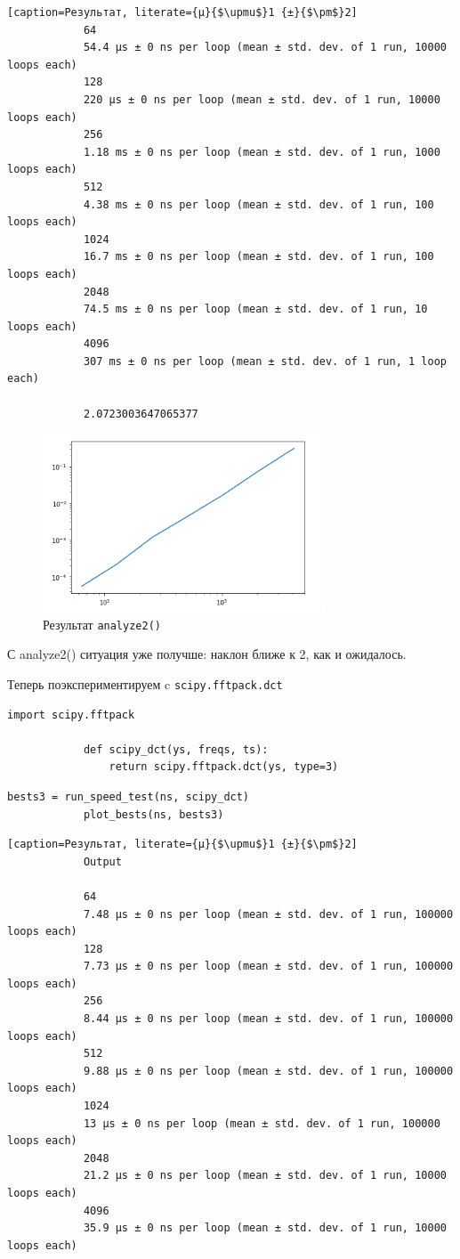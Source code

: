 \documentclass[a4paper,12pt]{article}
\begin{document}
\begin{enumerate}
\begin{lstlisting}[caption=Результат, literate={µ}{$\upmu$}1 {±}{$\pm$}2]
			64
			54.4 µs ± 0 ns per loop (mean ± std. dev. of 1 run, 10000 loops each)
			128
			220 µs ± 0 ns per loop (mean ± std. dev. of 1 run, 10000 loops each)
			256
			1.18 ms ± 0 ns per loop (mean ± std. dev. of 1 run, 1000 loops each)
			512
			4.38 ms ± 0 ns per loop (mean ± std. dev. of 1 run, 100 loops each)
			1024
			16.7 ms ± 0 ns per loop (mean ± std. dev. of 1 run, 100 loops each)
			2048
			74.5 ms ± 0 ns per loop (mean ± std. dev. of 1 run, 10 loops each)
			4096
			307 ms ± 0 ns per loop (mean ± std. dev. of 1 run, 1 loop each)
			
			2.0723003647065377
		\end{lstlisting}
		
		\begin{figure}[H]
			\centering
			\includegraphics[width=0.75\textwidth]{1_2.png}
			\caption{Результат \texttt{analyze2()}}
			\label{fig:1.2}
		\end{figure}
		
		С analyze2() ситуация уже получше: наклон ближе к 2, как и ожидалось.
		
		Теперь поэкспериментируем c \texttt{scipy.fftpack.dct}
		
		\begin{lstlisting}[caption=Функция \texttt{scipy\_dct()}]
			import scipy.fftpack
			
			def scipy_dct(ys, freqs, ts):
				return scipy.fftpack.dct(ys, type=3)
		\end{lstlisting}
		\begin{lstlisting}[caption=Работа с \texttt{scipy\_dct()}]
			bests3 = run_speed_test(ns, scipy_dct)
			plot_bests(ns, bests3)
		\end{lstlisting}
		\begin{lstlisting}[caption=Результат, literate={µ}{$\upmu$}1 {±}{$\pm$}2]
			Output
			
			64
			7.48 µs ± 0 ns per loop (mean ± std. dev. of 1 run, 100000 loops each)
			128
			7.73 µs ± 0 ns per loop (mean ± std. dev. of 1 run, 100000 loops each)
			256
			8.44 µs ± 0 ns per loop (mean ± std. dev. of 1 run, 100000 loops each)
			512
			9.88 µs ± 0 ns per loop (mean ± std. dev. of 1 run, 100000 loops each)
			1024
			13 µs ± 0 ns per loop (mean ± std. dev. of 1 run, 100000 loops each)
			2048
			21.2 µs ± 0 ns per loop (mean ± std. dev. of 1 run, 10000 loops each)
			4096
			35.9 µs ± 0 ns per loop (mean ± std. dev. of 1 run, 10000 loops each)
			

\end{lstlisting}
\end{enumerate}
\end{document}
